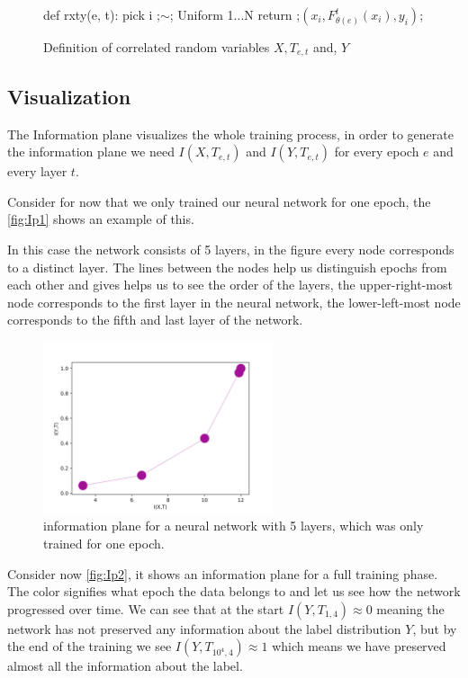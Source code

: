 \begin{figure}[H]
    \begin{pythonfigure}
      def rxty(e, t):
        pick i ;$\sim$; Uniform {1...N}
        return ;$(x_i, F_{\theta(e)}^t(x_i), y_i)$;
    \end{pythonfigure}
    \caption{Definition of correlated random variables $X, T_{e,t}$ and, $Y$}
    \label{fig:rxty}
\end{figure}

\subsection{Visualization}

The Information plane visualizes the whole training process, in order to
generate the information plane we need $I(X,T_{e,t})$ and $I(Y,T_{e,t})$ for every
epoch $e$ and every layer $t$.

Consider for now that we only trained our neural network for one epoch, the
\autoref{fig:Ip1} shows an example of this. 

In this case the network consists of 5 layers, in the figure every node
corresponds to a distinct layer. The lines between the nodes help us distinguish
epochs from each other and gives helps us to see the order of the layers, the
upper-right-most node corresponds to the first layer in the neural network, the
lower-left-most node corresponds to the fifth and last layer of the network.

\begin{figure}[H]
  \centering
  \includegraphics[width=0.60\textwidth]{figs/ip_1v2.png}
  \caption{
    information plane for a neural network with 5 layers, which was only trained
    for one epoch.
  }
  \label{fig:Ip1}
\end{figure}

Consider now \autoref{fig:Ip2}, it shows an information plane for a full
training phase. The color signifies what epoch the data belongs to and let us
see how the network progressed over time. We can see that at the start $I(Y,
T_{1,4}) \approx 0$ meaning the network has not preserved any information about
the label distribution $Y$, but by the end of the training we see $I(Y,
T_{10^4,4}) \approx 1$ which means we have preserved almost all the information
about the label.


